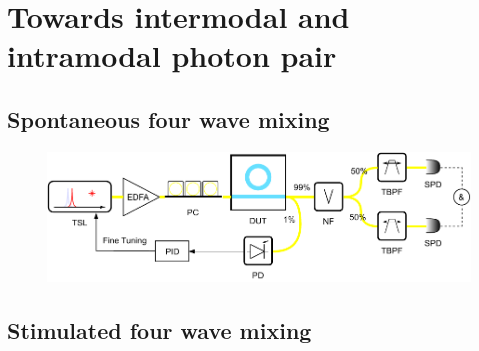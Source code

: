 
\chapter{Towards intermodal and intramodal photon pair}
\section{Spontaneous four wave mixing}



\begin{figure}
	\centering
	\includegraphics[width=1\linewidth]{imgs/pid.pdf}
	\caption{}
	\label{fig:bibpf}
\end{figure}

\begin{figure}
	\centering
	
	\label{fig:flux1}
\end{figure}

\begin{figure}
	\centering
	
	\mycaption{}{}
	\label{fig:}
\end{figure}


\section{Stimulated four wave mixing}

